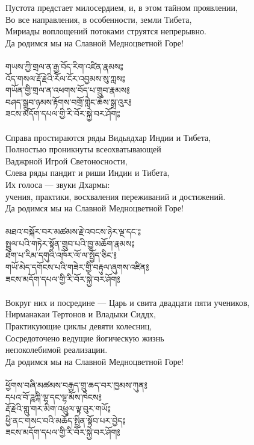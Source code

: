 Пустота предстает милосердием, и, в этом тайном проявлении,\\
Во все направления, в особенности, земли Тибета,\\
Мириады воплощений потоками струятся непрерывно.\\
Да родимся мы на Славной Медноцветной Горе!\\
\\
\newpage
{\ti གཡས་ཀྱི་གྲལ་ན་རྒྱ་བོད་རིག་འཛིན་རྣམས༔\\
འོད་གསལ་རྡོ་རྗེའི་རོལ་ངོར་འབྱམས་སུ་ཀླས༔\\
གཡོན་གྱི་གྲལ་ན་འཕགས་བོད་པ་གྲུབ་རྣམས༔\\
བཤད་སྒྲུབ་ཉམས་རྟོགས་བགྲོ་གླེང་ཆོས་སྒྲ་འུར༔\\
ཟངས་མདོག་དཔལ་གྱི་རི་བོར་སྐྱེ་བར་ཤོག༔}\\
\\
\ru
Справа простираются ряды Видьядхар Индии и Тибета,\\
Полностью проникнуты всеохватывающей \\ \indent Ваджрной Игрой Светоносности,\\
Слева ряды пандит и риши Индии и Тибета,\\
Их голоса — звуки Дхармы: \\ \indent учения, практики, восхваления переживаний и достижений.\\
Да родимся мы на Славной Медноцветной Горе!\\
\\
{\ti མཐའ་བསྐོར་བར་མཚམས་རྗེ་འབངས་ཉེར་ལྔ་དང་༔\\
སྤྲུལ་པའི་གཏེར་སྟོན་གྲུབ་པའི་ཁྱུ་མཆོག་རྣམས༔\\
ཐེག་པ་རིམ་དགུའི་འཁོར་ལོ་ལ་སྤྱོད་ཅིང་༔\\
གཡོ་མེད་དགོངས་པའི་གཟེར་གྱི་བརྟུལ་ཞུགས་འཛིན༔\\
ཟངས་མདོག་དཔལ་གྱི་རི་བོར་སྐྱེ་བར་ཤོག༔}\\
\\
\ru
Вокруг них и посредине — Царь и свита двадцати пяти учеников,\\
Нирманакаи Тертонов и Владыки Сиддх,\\
Практикующие циклы девяти колесниц,\\
Сосредоточено ведущие йогическую жизнь \\ \indent непоколебимой реализации.\\
Да родимся мы на Славной Медноцветной Горе!\\
\\
\newpage
{\ti ཕྱོགས་བཞི་མཚམས་བརྒྱད་གྲུ་ཆད་བར་ཁྱམས་ཀུན༔\\
དཔའ་བོ་ཌཱཀྐི་ལྷ་དང་ལྷ་མོས་ཁེངས༔\\
རྡོ་རྗེའི་གླུ་གར་མིག་འཕྲུལ་ལྟ་བུར་གཡོ༔\\
ཕྱི་ནང་གསང་བའི་མཆོད་སྤྲིན་སྟོབ་པར་བྱེད༔\\
ཟངས་མདོག་དཔལ་གྱི་རི་བོར་སྐྱེ་བར་ཤོག༔}\\

